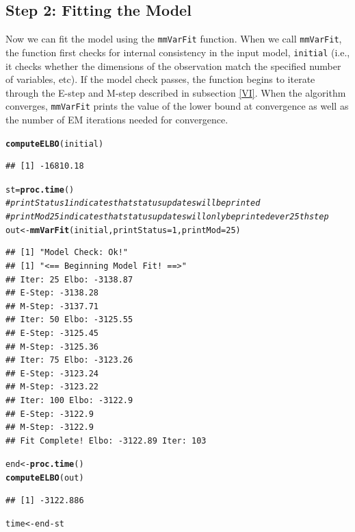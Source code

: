 \documentclass{article}\usepackage[]{graphicx}\usepackage[]{color}
\makeatletter
\newcommand{\hlnum}[1]{\textcolor[rgb]{0.686,0.059,0.569}{#1}}%
\newcommand{\hlcom}[1]{\textcolor[rgb]{0.678,0.584,0.686}{\textit{#1}}}%
\newcommand{\hlopt}[1]{\textcolor[rgb]{0,0,0}{#1}}%
\newcommand{\hlstd}[1]{\textcolor[rgb]{0.345,0.345,0.345}{#1}}%
\newcommand{\hlkwb}[1]{\textcolor[rgb]{0.69,0.353,0.396}{#1}}%
\newcommand{\hlkwc}[1]{\textcolor[rgb]{0.333,0.667,0.333}{#1}}%
\newcommand{\hlkwd}[1]{\textcolor[rgb]{0.737,0.353,0.396}{\textbf{#1}}}%
\newenvironment{kframe}{%
 \def\at@end@of@kframe{}%
 \ifinner\ifhmode%
  \def\at@end@of@kframe{\end{minipage}}%
  \begin{minipage}{\columnwidth}%
 \fi\fi%
 \def\FrameCommand##1{\hskip\@totalleftmargin \hskip-\fboxsep
 \colorbox{shadecolor}{##1}\hskip-\fboxsep
     \hskip-\linewidth \hskip-\@totalleftmargin \hskip\columnwidth}%
 \MakeFramed {\advance\hsize-\width
   \@totalleftmargin\z@ \linewidth\hsize
   \@setminipage}}%
 {\par\unskip\endMakeFramed%
 \at@end@of@kframe}
\newenvironment{knitrout}{}{} %
\renewenvironment{knitrout}{\begin{singlespace}}{\end{singlespace}}
\makeatother
\begin{document}
\subsection{Step 2: Fitting the Model}
Now we can fit the model using the \texttt{mmVarFit} function. When we call \texttt{mmVarFit}, the function first checks for internal consistency in the input model, \texttt{initial} (i.e., it checks whether the dimensions of the observation match the specified number of variables, etc). If the model check passes, the function begins to iterate through the E-step and M-step described in subsection \ref{VI}. When the algorithm converges, \texttt{mmVarFit} prints the value of the lower bound at convergence as well as the number of EM iterations needed for convergence.

\begin{knitrout}
\color{fgcolor}\begin{kframe}
\begin{alltt}
\hlkwd{computeELBO}\hlstd{(initial)}
\end{alltt}
\begin{verbatim}
## [1] -16810.18
\end{verbatim}
\begin{alltt}
\hlstd{st} \hlkwb{=} \hlkwd{proc.time}\hlstd{()}
\hlcom{#printStatus 1 indicates that status updates will be printed}
\hlcom{# printMod 25 indicates that status updates will only be printed ever 25th step}
\hlstd{out} \hlkwb{<-} \hlkwd{mmVarFit}\hlstd{(initial,} \hlkwc{printStatus} \hlstd{=} \hlnum{1}\hlstd{,} \hlkwc{printMod} \hlstd{=} \hlnum{25}\hlstd{)}
\end{alltt}
\begin{verbatim}
## [1] "Model Check: Ok!"
## [1] "<== Beginning Model Fit! ==>"
## Iter: 25 Elbo: -3138.87
## E-Step: -3138.28
## M-Step: -3137.71
## Iter: 50 Elbo: -3125.55
## E-Step: -3125.45
## M-Step: -3125.36
## Iter: 75 Elbo: -3123.26
## E-Step: -3123.24
## M-Step: -3123.22
## Iter: 100 Elbo: -3122.9
## E-Step: -3122.9
## M-Step: -3122.9
## Fit Complete! Elbo: -3122.89 Iter: 103
\end{verbatim}
\begin{alltt}
\hlstd{end} \hlkwb{<-} \hlkwd{proc.time}\hlstd{()}
\hlkwd{computeELBO}\hlstd{(out)}
\end{alltt}
\begin{verbatim}
## [1] -3122.886
\end{verbatim}
\begin{alltt}
\hlstd{time} \hlkwb{<-} \hlstd{end} \hlopt{-} \hlstd{st}
\end{alltt}
\end{kframe}
\end{knitrout}
\end{document}
